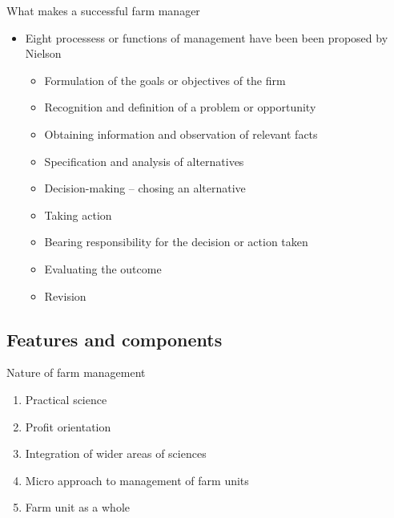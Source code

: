 \documentclass[12pt,ignorenonframetext,aspectratio=169]{beamer}
\providecommand{\tightlist}{%
  \setlength{\itemsep}{0pt}\setlength{\parskip}{0pt}}
\begin{document}
\begin{frame}{What makes a successful farm manager}
\protect\hypertarget{what-makes-a-successful-farm-manager}{}
\begin{itemize}
\tightlist
\item
  Eight processess or functions of management have been been proposed by
  Nielson

  \begin{itemize}
  \tightlist
  \item
    Formulation of the goals or objectives of the firm
  \item
    Recognition and definition of a problem or opportunity
  \item
    Obtaining information and observation of relevant facts
  \item
    Specification and analysis of alternatives
  \item
    Decision-making -- chosing an alternative
  \item
    Taking action
  \item
    Bearing responsibility for the decision or action taken
  \item
    Evaluating the outcome
  \item
    Revision
  \end{itemize}
\end{itemize}
\end{frame}

\hypertarget{features-and-components}{%
\subsection{Features and components}\label{features-and-components}}

\begin{frame}{Nature of farm management}
\protect\hypertarget{nature-of-farm-management}{}
\begin{enumerate}
\tightlist
\item
  Practical science
\item
  Profit orientation
\item
  Integration of wider areas of sciences
\item
  Micro approach to management of farm units
\item
  Farm unit as a whole
\end{enumerate}
\end{frame}
\end{document}
